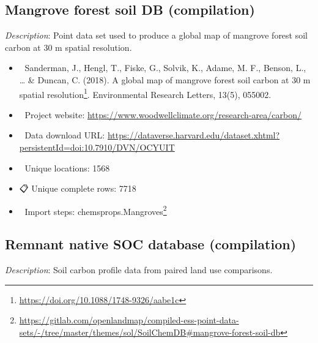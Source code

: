 \documentclass[
  graybox,natbib,nospthms]{svmono}
\providecommand{\tightlist}{%
  \setlength{\itemsep}{0pt}\setlength{\parskip}{0pt}}
\providecommand{\tightlist}{\setlength{\itemsep}{0pt}\setlength{\parskip}{0pt}}
\renewcommand{\href}[2]{#2 (\url{#1})}
\renewcommand{\href}[2]{#2\footnote{\url{#1}}}
\begin{document}
\hypertarget{mangrove-forest-soil-db-compilation}{%
\subsection{Mangrove forest soil DB (compilation)}\label{mangrove-forest-soil-db-compilation}}

\emph{Description}: Point data set used to produce a global map of mangrove forest
soil carbon at 30 m spatial resolution.

\begin{itemize}
\tightlist
\item
  📕 Sanderman, J., Hengl, T., Fiske, G., Solvik, K., Adame, M. F., Benson, L., \ldots{} \& Duncan, C. (2018). \href{https://doi.org/10.1088/1748-9326/aabe1c}{A global map of mangrove forest soil carbon at 30 m spatial resolution}. Environmental Research Letters, 13(5), 055002.\\
\item
  🔗 Project website: \url{https://www.woodwellclimate.org/research-area/carbon/}\\
\item
  📂 Data download URL: \url{https://dataverse.harvard.edu/dataset.xhtml?persistentId=doi:10.7910/DVN/OCYUIT}\\
\item
  📍 Unique locations: 1568\\
\item
  📋 Unique complete rows: 7718\\
\item
  📝 Import steps: \href{https://gitlab.com/openlandmap/compiled-ess-point-data-sets/-/tree/master/themes/sol/SoilChemDB\#mangrove-forest-soil-db}{chemsprops.Mangroves}
\end{itemize}

\hypertarget{remnant-native-soc-database-compilation}{%
\subsection{Remnant native SOC database (compilation)}\label{remnant-native-soc-database-compilation}}

\emph{Description}: Soil carbon profile data from paired land use comparisons.
\end{document}
